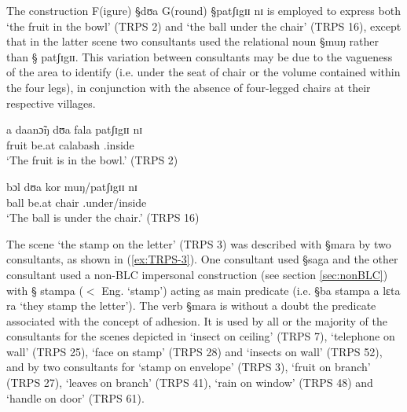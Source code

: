 



The construction  F(igure) {\S dʊa} G(round) {\S patʃɪgɪɪ nɪ} is employed to 
express both `the
fruit in the
bowl' (TRPS 2) and `the ball under the chair'  (TRPS 16), except that in the
latter scene two consultants used the relational noun {\S muŋ} rather than  {\S
patʃɪgɪɪ}. This variation between  consultants may be due to the vagueness of
the area to identify (i.e. under the seat of chair or the volume contained
within
the four legs), in conjunction with the absence of four-legged chairs at their
respective villages.


 \begin{exe}
 \ex\label{ex:TRPS-2-16}

 \begin{xlist}
 \ex\label{ex:TRPS-2}
 \gll a daanɔ̃ŋ dʊa fala  patʃɪgɪɪ nɪ   \\
{\art} fruit be.at  calabash {\reln .inside} {\postp} \\
 \glt `The fruit is in the bowl.' (TRPS 2)

 \ex\label{ex:TRPS-16}
 \gll bɔl dʊa kor muŋ/patʃɪgɪɪ nɪ\\
ball  be.at  chair {\reln .under/inside} {\postp}  \\
 \glt `The ball is under the chair.' (TRPS 16)

 \end{xlist}
 \end{exe}

 

 The scene `the stamp on the letter'  (TRPS  3) was described with {\S mara}
by two consultants, as shown in (\ref{ex:TRPS-3}). One consultant used {\S saga}
and
the other consultant used
a non-BLC impersonal construction (see section \ref{sec:nonBLC}) with {\S
stampa} ($<$ Eng. `stamp')  acting as main predicate (i.e. {\S ba stampa a lɛta
ra} `they stamp the letter').  The verb {\S mara} is
without a doubt the predicate associated with the concept of adhesion. It is
used by all or the majority of the consultants for the scenes depicted in
`insect on ceiling' (TRPS 7),  `telephone on wall'  (TRPS 25),  `face on stamp'
 (TRPS 28) and  `insects on wall' (TRPS 52), and by two consultants for 
`stamp on envelope' (TRPS 3), `fruit on branch' (TRPS 27), `leaves on
branch' (TRPS 41), `rain on window' (TRPS 48) and `handle on door' (TRPS 61).



